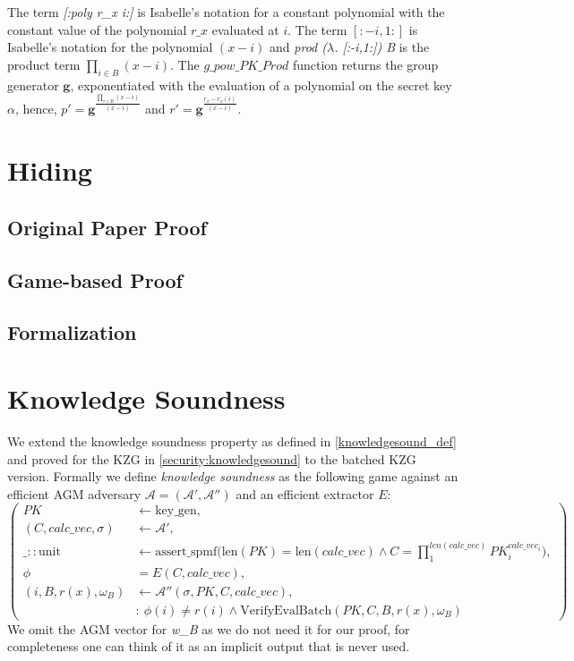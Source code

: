 The term \textit{[:poly r\_x i:]} is Isabelle's notation for a constant polynomial with the constant value of the polynomial $r\_x$ evaluated at $i$. The term $[:-i,1:]$ is Isabelle's notation for the polynomial $(x-i)$ and \textit{prod ($\lambda$. [:-i,1:]) B} is the product term $\prod_{i\in B}^{}(x-i)$. The $g\_pow\_PK\_Prod$ function returns the group generator $\mathbf{g}$, exponentiated with the evaluation of a polynomial on the secret key $\alpha$, hence, $p'=\mathbf{g}^{\frac{\prod_{i\in B}^{}(x-i)}{(x-i)}}$ and $r'=\mathbf{g}^{\frac{r_x-r_x(i)}{(x-i)}}$.

\section{Hiding}
\label{batch:security:hiding}

\subsection*{Original Paper Proof}

\subsection*{Game-based Proof}

\subsection*{Formalization}

\section{Knowledge Soundness}
We extend the knowledge soundness property as defined in \ref{knowledgesound_def}
and proved for the KZG in \ref{security:knowledgesound} to the batched KZG version. Formally we define \textit{knowledge soundness} as the following game against an efficient AGM adversary $\mathcal{A=(A',A'')}$ and an efficient extractor $E$: 
\begin{equation*}
    \left(
        \begin{aligned}
            PK &\leftarrow \text{key\_gen}, \\
            (C,calc\_vec, \sigma) &\leftarrow \mathcal{A'}, \\
            \_::\text{unit} &\leftarrow \text{assert\_spmf}\biggl(\text{len}(PK)=\text{len}(calc\_vec) \land C = \prod_{1}^{len(calc\_vec)}PK_i^{calc\_vec_i}\biggr), \\
            \phi &= E(C, calc\_vec),\\
            (i, B, r(x), \omega_B) &\leftarrow \mathcal{A''}(\sigma, PK, C, calc\_vec), \\
            & : \ \phi(i) \ne r(i) \land \text{VerifyEvalBatch}(PK,C,B,r(x),\omega_B)
        \end{aligned}
        \right)
\end{equation*}
We omit the AGM vector for \textit{w\_B} as we do not need it for our proof, for completeness one can think of it as an implicit output that is never used.

